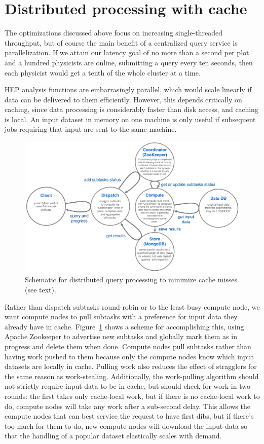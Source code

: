 \documentclass[a4paper]{jpconf}
\begin{document}
\section{Distributed processing with cache}

The optimizations discussed above focus on increasing single-threaded throughput, but of course the main benefit of a centralized query service is parallelization. If we attain our latency goal of no more than a second per plot and a hundred physicists are online, submitting a query every ten seconds, then each physicist would get a tenth of the whole cluster at a time.

HEP analysis functions are embarrasingly parallel, which would scale linearly if data can be delivered to them efficiently. However, this depends critically on caching, since data processing is considerably faster than disk access, and caching is local. An input dataset in memory on one machine is only useful if subsequent jobs requiring that input are sent to the same machine.

\begin{figure}[b]
\begin{center}
\includegraphics[width=0.5\linewidth]{distributed-layout.png}
\end{center}

\caption{\label{fig:distributed} Schematic for distributed query processing to minimize cache misses (see text).}
\end{figure}

Rather than dispatch subtasks round-robin or to the least busy compute node, we want compute nodes to pull subtasks with a preference for input data they already have in cache. Figure~\ref{fig:distributed} shows a scheme for accomplishing this, using Apache Zookeeper to advertise new subtasks and globally mark them as in progress and delete them when done. Compute nodes pull subtasks rather than having work pushed to them because only the compute nodes know which input datasets are locally in cache. Pulling work also reduces the effect of stragglers for the same reason as work-stealing. Additionally, the work-pulling algorithm should not strictly require input data to be in cache, but should check for work in two rounds: the first takes only cache-local work, but if there is no cache-local work to do, compute nodes will take any work after a sub-second delay. This allows the compute nodes that can best service the request to have first dibs, but if there's too much for them to do, new compute nodes will download the input data so that the handling of a popular dataset elastically scales with demand.
\end{document}
